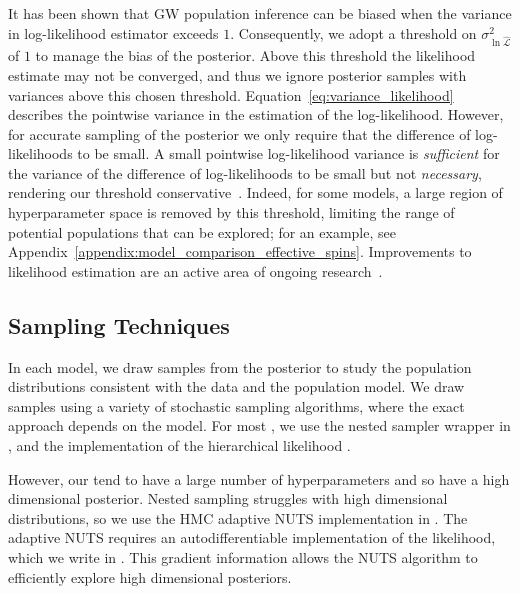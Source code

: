 It has been shown that \ac{GW} population inference can be biased when the variance in log-likelihood estimator exceeds $1$.
Consequently, we adopt a threshold on $\sigma^2_{\ln \hat{\mathcal{L}}}$ of $1$ to manage the bias of the posterior. Above this threshold the likelihood estimate may not be converged, and thus we ignore posterior samples with variances above this chosen threshold. Equation~\eqref{eq:variance_likelihood} describes the pointwise variance in the estimation of the log-likelihood. However, for accurate sampling of the posterior we only require that the difference of log-likelihoods to be small. A small pointwise log-likelihood variance is \textit{sufficient} for the variance of the difference of log-likelihoods to be small but not \textit{necessary}, rendering our threshold conservative~\citep{Farr:2019rap, Essick:2022ojx}. Indeed, for some models, a large region of hyperparameter space is removed by this threshold, limiting the range of potential populations that can be explored; for an example, see Appendix~\ref{appendix:model_comparison_effective_spins}.
Improvements to likelihood estimation are an active area of ongoing research~\citep{Wysocki:2018mpo,Doctor:2019ruh,Delfavero:2021qsc,Golomb:2021tll,Mould:2023eca,Hussain:2024qzl,Mancarella:2025uat}.

\subsection{Sampling Techniques}

In each model, we draw samples from the posterior to study the population distributions consistent with the data and the population model.
We draw samples using a variety of stochastic sampling algorithms, where the exact approach depends on the model. 
For most \parametrics, we use the nested sampler \DYNESTY\citep{Speagle:2019ivv} wrapper in \BILBY\citep{Ashton:2018jfp}, and the \GWPOPULATION implementation of the hierarchical likelihood \citep{Talbot:2024yqw}.

However, our \nonparametrics tend to have a large number of hyperparameters and so have a high dimensional posterior.
Nested sampling struggles with high dimensional distributions, so we use the \ac{HMC} adaptive \ac{NUTS} implementation in \NUMPYRO\citep{Phan:2019elc, Bingham:2019}. 
The \NUMPYRO adaptive \ac{NUTS} requires an autodifferentiable implementation of the likelihood, which we write in \JAX\citep{Bradbury:2018}.
This gradient information allows the \ac{NUTS} algorithm to efficiently explore high dimensional posteriors. 

